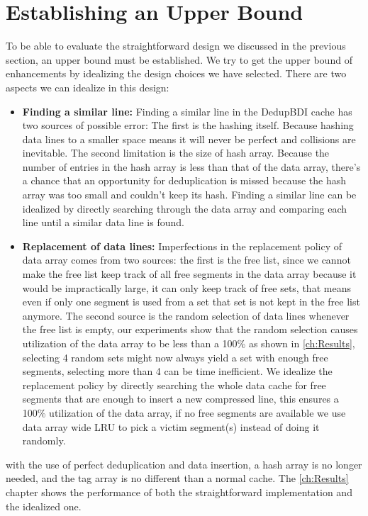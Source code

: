\section{Establishing an Upper Bound}
\label{sec:Upper Bound}
To be able to evaluate the straightforward design we discussed in the previous section, an upper bound must be established. We try to get the upper bound of enhancements by idealizing the design choices we have selected. There are two aspects we can idealize in this design:
\begin{itemize}
    \item \textbf{Finding a similar line:} Finding a similar line in the DedupBDI cache has two sources of possible error: The first is the hashing itself. Because hashing data lines to a smaller space means it will never be perfect and collisions are inevitable. The second limitation is the size of hash array. Because the number of entries in the hash array is less than that of the data array, there's a chance that an opportunity for deduplication is missed because the hash array was too small and couldn't keep its hash. Finding a similar line can be idealized by directly searching through the data array and comparing each line until a similar data line is found.
    \item \textbf{Replacement of data lines:} Imperfections in the replacement policy of data array comes from two sources: the first is the free list, since we cannot make the free list keep track of all free segments in the data array because it would be impractically large, it can only keep track of free sets, that means even if only one segment is used from a set that set is not kept in the free list anymore. The second source is the random selection of data lines whenever the free list is empty, our experiments show that the random selection causes utilization of the data array to be less than a 100\% as shown in \ref{ch:Results}, selecting 4 random sets might now always yield a set with enough free segments, selecting more than 4 can be time inefficient. We idealize the replacement policy by directly searching the whole data cache for free segments that are enough to insert a new compressed line, this ensures a 100\% utilization of the data array, if no free segments are available we use data array wide LRU to pick a victim segment(s) instead of doing it randomly.
\end{itemize}
with the use of perfect deduplication and data insertion, a hash array is no longer needed, and the tag array is no different than a normal cache. The \ref{ch:Results} chapter shows the performance of both the straightforward implementation and the idealized one.



